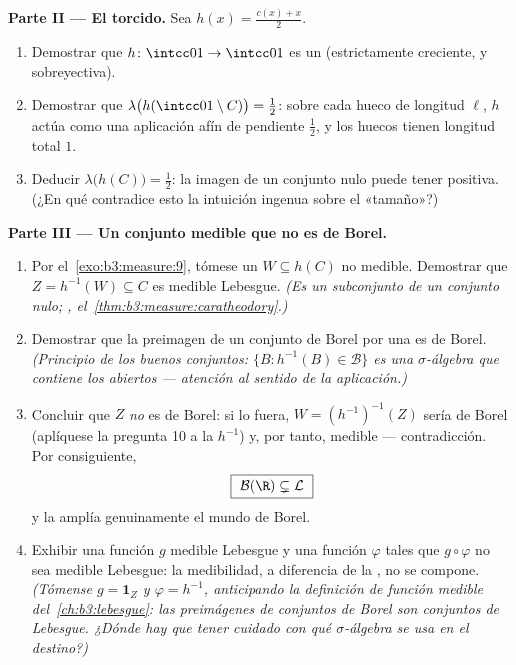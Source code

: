 \begin{problem}
\medskip
\noindent\textbf{Parte II --- El
 torcido.} Sea
$h(x) = \frac{c(x) + x}{2}$.
\begin{enumerate}[resume]
  \item Demostrar que $h \colon \intcc01 \to \intcc01$ es un
   (estrictamente
  creciente,  y
  sobreyectiva). \item Demostrar que
  $\lambda\bigl(h(\intcc01\setminus C)\bigr) =
        \tfrac12$: sobre cada hueco de longitud $\ell$, $h$ actúa como
  una aplicación afín de pendiente $\tfrac12$, y los huecos tienen
  longitud total $1$. \item Deducir
  $\lambda\bigl(h(C)\bigr) = \tfrac12$: la imagen
   de un conjunto nulo
  puede tener  positiva. (¿En qué
  contradice esto la intuición ingenua sobre el «tamaño»?)
\end{enumerate}

\medskip
\noindent\textbf{Parte III --- Un conjunto medible que no es de Borel.}
\begin{enumerate}[resume]
  \item Por el~\cref{exo:b3:measure:9}, tómese un $W
        \subseteq h(C)$ no medible. Demostrar que
  $Z = h^{-1}(W) \subseteq C$ es medible Lebesgue. \emph{(Es un
  subconjunto de un conjunto nulo;
  ,
  el~\cref{thm:b3:measure:caratheodory}.)} \item Demostrar que la
  preimagen de un conjunto de Borel por una
   es de Borel.
  \emph{(Principio de los buenos conjuntos:
  $\{B : h^{-1}(B) \in \mathcal B\}$ es una $\sigma$-álgebra que
  contiene los abiertos --- atención
  al sentido de la aplicación.)} \item Concluir que $Z$ \emph{no} es de
  Borel: si lo fuera, $W = (h^{-1})^{-1}(Z)$ sería de Borel (aplíquese
  la pregunta 10 a la 
  $h^{-1}$) y, por tanto, medible --- contradicción. Por consiguiente,
        \[
        \boxed{\ \mathcal B(\R) \subsetneq \mathcal L\ }
        \]
        y la  amplía
        genuinamente el mundo de Borel. \item Exhibir una función $g$
        medible Lebesgue y una función $\varphi$
         tales que $g \circ
        \varphi$ no sea medible Lebesgue: la medibilidad, a diferencia
        de la , no se
        compone. \emph{(Tómense $g =
        \mathbf 1_Z$ y $\varphi = h^{-1}$, anticipando la definición de
        función medible del~\cref{ch:b3:lebesgue}: las preimágenes de
        conjuntos de Borel son conjuntos de Lebesgue. ¿Dónde hay que
        tener cuidado con qué $\sigma$-álgebra se usa en el destino?)}
\end{enumerate}


\end{problem}
